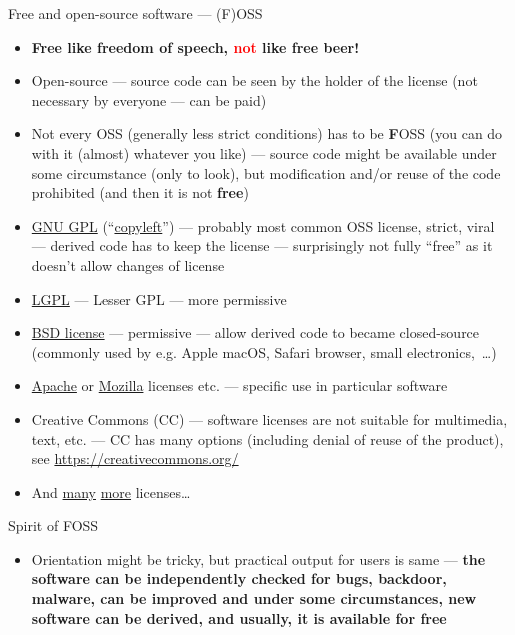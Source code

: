 \documentclass[compress, ucs, xelatex, 11pt, xcolor=svgnames, aspectratio=169,
	hyperref={
		bookmarks=true,
		unicode=true,
		colorlinks=true,
		pdftitle={Linux, command line and MetaCentrum},
		plainpages=false,
		pdfauthor={Vojtech Zeisek},
		pdfsubject={Course about use of Linux command line, writing shell scripts and using MetaCentrum of CESNET},
		pdfcreator={XeLaTeX},
		pdfkeywords={Linux, GNU, BASH, shell, command line, MetaCentrum},
		linkcolor=DarkRed, %
		anchorcolor=DarkBlue, %
		citecolor=Indigo, %
		filecolor=NavyBlue, %
		menucolor=DarkMagenta, %
		urlcolor=DarkBlue, %
		pdftex},
	url={hyphens, lowtilde} %
	]{beamer}
\renewcommand{\alert}[1]{\textcolor{red}{#1}}
\begin{document}
\begin{frame}[allowframebreaks]{Free and open-source software --- (F)OSS}
	\begin{itemize}
		\item \textbf{Free like freedom of speech, \alert{not} like free beer!}
		\item Open-source --- source code can be seen by the holder of the license (not necessary by everyone --- can be paid)
		\item Not every OSS (generally less strict conditions) has to be \textbf{F}OSS (you can do with it (almost) whatever you like) --- source code might be available under some circumstance (only to look), but modification and/or reuse of the code prohibited (and then it is not \textbf{free})
		\item \href{https://www.gnu.org/licenses/gpl-3.0.html}{GNU GPL} (\enquote{\href{https://www.gnu.org/copyleft/}{copyleft}}) --- probably most common OSS license, strict, viral --- derived code has to keep the license --- surprisingly not fully \enquote{free} as it doesn't allow changes of license
		\item \href{https://www.gnu.org/licenses/lgpl-3.0.en.html}{LGPL} --- Lesser GPL --- more permissive
		\item \href{https://en.wikipedia.org/wiki/BSD_licenses}{BSD license} --- permissive --- allow derived code to became closed-source (commonly used by e.g. Apple macOS, Safari browser, small electronics,~\ldots)
		\item \href{https://www.apache.org/licenses/}{Apache} or \href{https://www.mozilla.org/MPL/}{Mozilla} licenses etc. --- specific use in particular software
		\item Creative Commons (CC) --- software licenses are not suitable for multimedia, text, etc. --- CC has many options (including denial of reuse of the product), see \url{https://creativecommons.org/}
		\item And \href{https://en.wikipedia.org/wiki/Comparison_of_free_and_open-source_software_licenses}{many} \href{https://opensource.org/licenses}{more} licenses\ldots
	\end{itemize}
	\begin{block}{Spirit of FOSS}
		\begin{itemize}
			\item Orientation might be tricky, but practical output for users is same --- \textbf{the software can be independently checked for bugs, backdoor, malware, can be improved and under some circumstances, new software can be derived, and usually, it is available for free}

\end{itemize}
\end{block}
\end{frame}
\end{document}
